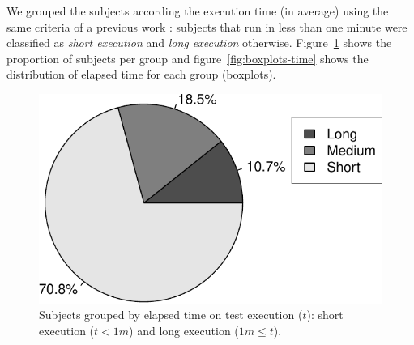 


We grouped the subjects according the execution time (in average)
using the same criteria of a previous work
\cite{gligoric-etal-issta2015}: subjects that run in less than one
minute were classified as \emph{short execution} and \emph{long
execution} otherwise. Figure~\ref{fig:piechart-time} shows the
proportion of subjects per group and figure~\ref{fig:boxplots-time}
shows the distribution of elapsed time for each group (boxplots).

\begin{figure}[h!]
    \centering
    \begin{minipage}{2in}%
    \includegraphics[width=\textwidth]{plots/piechart-timecost.pdf}
    \end{minipage}%
    \caption{\label{fig:piechart-time} Subjects grouped by elapsed
    time on test execution ($t$): short execution ($t < 1m$) and long
    execution ($1m \leq t$).}
\end{figure}

